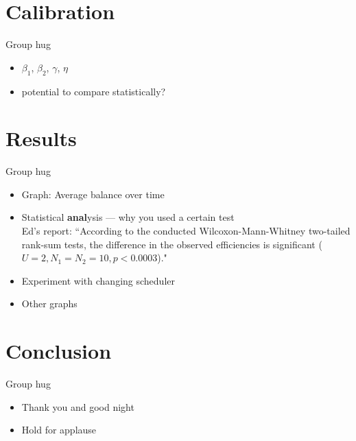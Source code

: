 \documentclass{acm_proc_article-sp}
\begin{document}
\section{Calibration}
Group hug
\begin{itemize} \itemsep0pt
	\item $\beta_1$, $\beta_2$, $\gamma$, $\eta$
	\item potential to compare statistically?
\end{itemize}


\section{Results}
Group hug
\begin{itemize} \itemsep0pt
	\item Graph: Average balance over time
	\item Statistical \textbf{anal}ysis --- why you used a certain test\\
Ed's report: ``According to the conducted Wilcoxon-Mann-Whitney two-tailed rank-sum tests, the difference in the observed efficiencies is significant ($U = 2, N_1 = N_2 = 10, p < 0.0003$)."
	\item Experiment with changing scheduler
	\item Other graphs
\end{itemize}

\section{Conclusion}
Group hug
\begin{itemize} \itemsep0pt
	\item Thank you and good night
	\item Hold for applause
\end{itemize}


%
%
\end{document}
